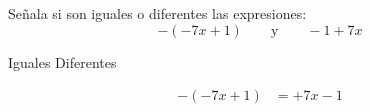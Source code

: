 


Señala si son iguales o diferentes las expresiones: \[-(-7x+1)\qquad\text{y}\qquad-1+7x\]
\begin{oneparchoices}
    \CorrectChoice Iguales
    \choice Diferentes
\end{oneparchoices}
\begin{solutionbox}{2cm}
    \begin{align*}
        -(-7x+1) & =+7x-1
    \end{align*}
\end{solutionbox}
